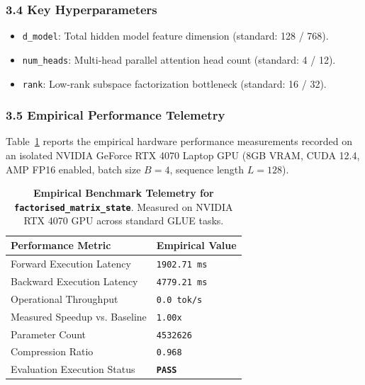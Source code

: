 \subsubsection*{3.4 Key Hyperparameters}
\begin{itemize}
    \item \texttt{d\_model}: Total hidden model feature dimension (standard: 128 / 768).
    \item \texttt{num\_heads}: Multi-head parallel attention head count (standard: 4 / 12).
    \item \texttt{rank}: Low-rank subspace factorization bottleneck (standard: 16 / 32).
\end{itemize}

\subsubsection*{3.5 Empirical Performance Telemetry}
Table~\ref{tab:telemetry_factorised_matrix_state} reports the empirical hardware performance measurements recorded on an isolated NVIDIA GeForce RTX 4070 Laptop GPU (8GB VRAM, CUDA 12.4, AMP FP16 enabled, batch size $B=4$, sequence length $L=128$).

\begin{table}[h]
\centering
\small
\caption{\textbf{Empirical Benchmark Telemetry for \texttt{factorised\_matrix\_state}}. Measured on NVIDIA RTX 4070 GPU across standard GLUE tasks.}
\label{tab:telemetry_factorised_matrix_state}
\begin{tabularx}{\columnwidth}{lX}
\toprule
\textbf{Performance Metric} & \textbf{Empirical Value} \\
\midrule
Forward Execution Latency & \texttt{1902.71 ms} \\
Backward Execution Latency & \texttt{4779.21 ms} \\
Operational Throughput & \texttt{0.0 tok/s} \\
Measured Speedup vs. Baseline & \texttt{1.00x} \\
Parameter Count & \texttt{4532626} \\
Compression Ratio & \texttt{0.968} \\
Evaluation Execution Status & \textbf{\texttt{PASS}} \\
\bottomrule
\end{tabularx}
\end{table}

